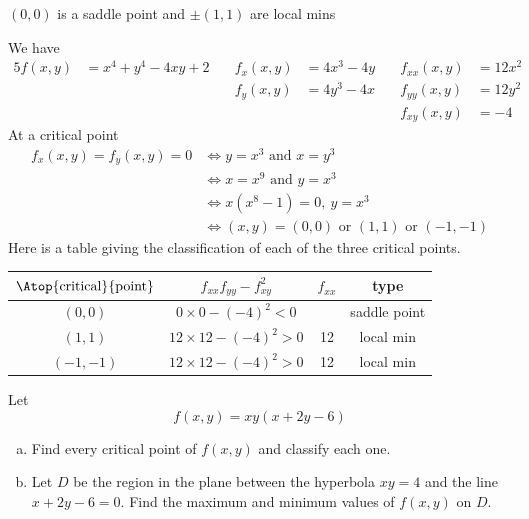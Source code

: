 \begin{answer}
$(0,0)$ is a saddle point and $\pm(1,1)$ are local mins
\end{answer}

\begin{solution}
We have
\begin{alignat*}{5}
f(x,y)&=x^4+y^4-4xy+2\quad &
f_x(x,y)&=4x^3-4y\quad &
f_{xx}(x,y)&=12x^2
\\
 & & f_y(x,y)&=4y^3-4x &
f_{yy}(x,y)&=12y^2
\\
 & & & &f_{xy}(x,y)&=-4
\end{alignat*}
At a critical point
\begin{align*}
f_x(x,y)=f_y(x,y)=0
&\iff y=x^3\text{ and }x=y^3 \\
&\iff x=x^9\text{ and }y=x^3 \\
&\iff x(x^8-1)=0,\ y=x^3 \\
&\iff (x,y)=(0,0)\text{ or }(1,1)\text{ or }(-1,-1)
\end{align*}
Here is a table giving the classification of each of the three critical
points.

\begin{center}
\renewcommand{\arraystretch}{1.3}
     \begin{tabular}{|c|c|c|c|}
     \hline
    $\Atop{\text{critical}}{\text{point}}$  & $f_{xx}f_{yy}-f_{xy}^2$ & 
                                                          $f_{xx}$ & type \\    
    \hline
     $(0,0)$   & $0\times 0-(-4)^2<0$   &    & saddle point \\ \hline
     $(1,1)$   & $12\times 12-(-4)^2>0$ & 12 & local min \\  \hline
     $(-1,-1)$ & $12\times 12-(-4)^2>0$ & 12 & local min \\  \hline
     \end{tabular}
\renewcommand{\arraystretch}{1.0}
\end{center}
\end{solution}

\begin{question}[M200 2003A] %
Let
\begin{equation*}
f(x,y)=xy(x+2y-6)
\end{equation*}
\begin{enumerate}[(a)]
\item
 Find every critical point of $f(x,y)$ and classify each one.
\item
 Let $D$ be the region in the plane between the hyperbola
$xy=4$ and the line $x+2y-6=0$. Find the maximum and minimum values of
$f(x,y)$ on $D$.
\end{enumerate}
\end{question}

